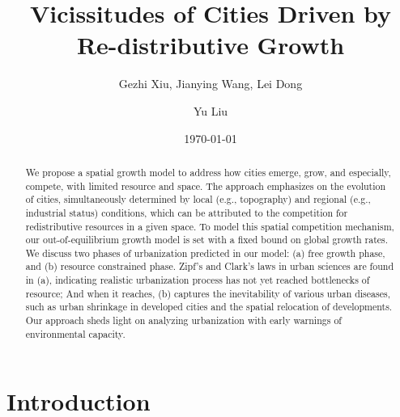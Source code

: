 \documentclass[reprint,unsortedaddress,amsmath,amssymb,aps,prl,showkeys]{revtex4-2}
\begin{document}
\title{Vicissitudes of Cities Driven by Re-distributive Growth}
\author{Gezhi Xiu, Jianying Wang, Lei Dong}
\author{Yu Liu}
\date{\today}

\begin{abstract}
    We propose a spatial growth model to address how cities emerge, grow, and especially, compete, with limited resource and space. The approach emphasizes on the evolution of cities, simultaneously determined by local (e.g., topography) and regional (e.g., industrial status) conditions, which can be attributed to the competition for redistributive resources in a given space. To model this spatial competition mechanism, our out-of-equilibrium growth model is set with a fixed bound on global growth rates. We discuss two phases of urbanization predicted in our model:
    (a) free growth phase, and (b) resource constrained phase.
    Zipf's and Clark's laws in urban sciences are found in (a), indicating realistic urbanization process has not yet reached bottlenecks of resource; And when it reaches, (b) captures the inevitability of various urban diseases, such as urban shrinkage in developed cities and the spatial relocation of developments. Our approach sheds light on analyzing urbanization with early warnings of environmental capacity.
\end{abstract}
\maketitle
\section{Introduction}
\end{document}
